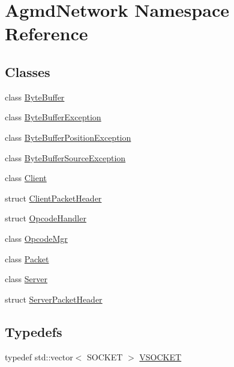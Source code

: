 \hypertarget{namespace_agmd_network}{\section{Agmd\+Network Namespace Reference}
\label{namespace_agmd_network}
}
\subsection*{Classes}
\begin{DoxyCompactItemize}
\item 
class \hyperlink{class_agmd_network_1_1_byte_buffer}{Byte\+Buffer}
\item 
class \hyperlink{class_agmd_network_1_1_byte_buffer_exception}{Byte\+Buffer\+Exception}
\item 
class \hyperlink{class_agmd_network_1_1_byte_buffer_position_exception}{Byte\+Buffer\+Position\+Exception}
\item 
class \hyperlink{class_agmd_network_1_1_byte_buffer_source_exception}{Byte\+Buffer\+Source\+Exception}
\item 
class \hyperlink{class_agmd_network_1_1_client}{Client}
\item 
struct \hyperlink{struct_agmd_network_1_1_client_packet_header}{Client\+Packet\+Header}
\item 
struct \hyperlink{struct_agmd_network_1_1_opcode_handler}{Opcode\+Handler}
\item 
class \hyperlink{class_agmd_network_1_1_opcode_mgr}{Opcode\+Mgr}
\item 
class \hyperlink{class_agmd_network_1_1_packet}{Packet}
\item 
class \hyperlink{class_agmd_network_1_1_server}{Server}
\item 
struct \hyperlink{struct_agmd_network_1_1_server_packet_header}{Server\+Packet\+Header}
\end{DoxyCompactItemize}
\subsection*{Typedefs}
\begin{DoxyCompactItemize}
\item 
typedef std\+::vector$<$ S\+O\+C\+K\+E\+T $>$ \hyperlink{namespace_agmd_network_aba5ae1369f23aea31252425887b51ba1}{V\+S\+O\+C\+K\+E\+T}
\end{DoxyCompactItemize}
